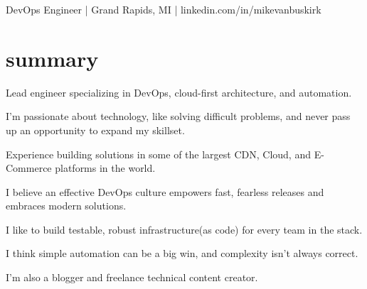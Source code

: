 \documentclass[]{mv_cv}
\begin{document}
       {DevOps Engineer | Grand Rapids, MI | linkedin.com/in/mikevanbuskirk}
 
\section{summary}
\begin{content}
{
Lead engineer specializing in DevOps, cloud-first architecture, and automation.

I'm passionate about technology, like solving difficult problems, and never pass up an opportunity to expand my skillset.

Experience building solutions in some of the largest CDN, Cloud, and E-Commerce platforms in the world.

I believe an effective DevOps culture empowers fast, fearless releases and embraces modern solutions.

I like to build testable, robust infrastructure(as code) for every team in the stack.

I think simple automation can be a big win, and complexity isn't always correct.

I'm also a blogger and freelance technical content creator.
}
\end{content}
\end{document}
